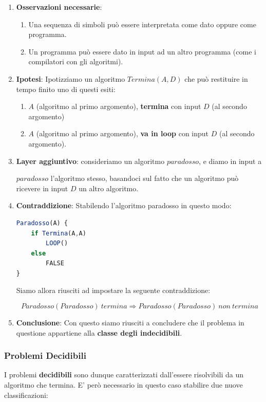 \documentclass{article}
\begin{document}
\begin{enumerate}
    \item \textbf{Osservazioni necessarie}:
    \begin{enumerate}
        \item Una sequenza di simboli può essere interpretata come dato oppure come programma.
        \item Un programma può essere dato in input ad un altro programma (come i compilatori con gli algoritmi).
    \end{enumerate}
    \item \textbf{Ipotesi}: Ipotizziamo un algoritmo $Termina(A,D)$ che può restituire in tempo finito uno di questi esiti:
    \begin{enumerate}
        \item $A$ (algoritmo al primo argomento), \textbf{termina} con input $D$ (al secondo argomento)
        \item $A$ (algoritmo al primo argomento), \textbf{va in loop} con input $D$ (al secondo argomento).
    \end{enumerate}
    \item \textbf{Layer aggiuntivo}: consideriamo un algoritmo $paradosso$, e diamo in input a 
    
    $paradosso$ l'algoritmo stesso, basandoci sul fatto che un algoritmo può ricevere in input $D$ un altro algoritmo.
    \item \textbf{Contraddizione}: Stabilendo l'algoritmo paradosso in questo modo:
\begin{lstlisting}[language=JavaScript]
Paradosso(A) {
    if Termina(A,A)
        LOOP()
    else 
        FALSE
}
\end{lstlisting}    

Siamo allora riusciti ad impostare la seguente contraddizione:

\begin{equation}
    Paradosso(Paradosso) \: termina \Rightarrow Paradosso(Paradosso) \:  non \: termina
\end{equation}

\item \textbf{Conclusione}: Con questo siamo riusciti a concludere che il problema in questione appartiene alla \textbf{classe degli indecidibili}.
    
\end{enumerate}

\newpage

\subsubsection{Problemi Decidibili} I problemi \textbf{decidibili} sono dunque caratterizzati dall'essere risolvibili da un algoritmo che termina. E' però necessario in questo caso stabilire due nuove classificazioni:
\end{document}

